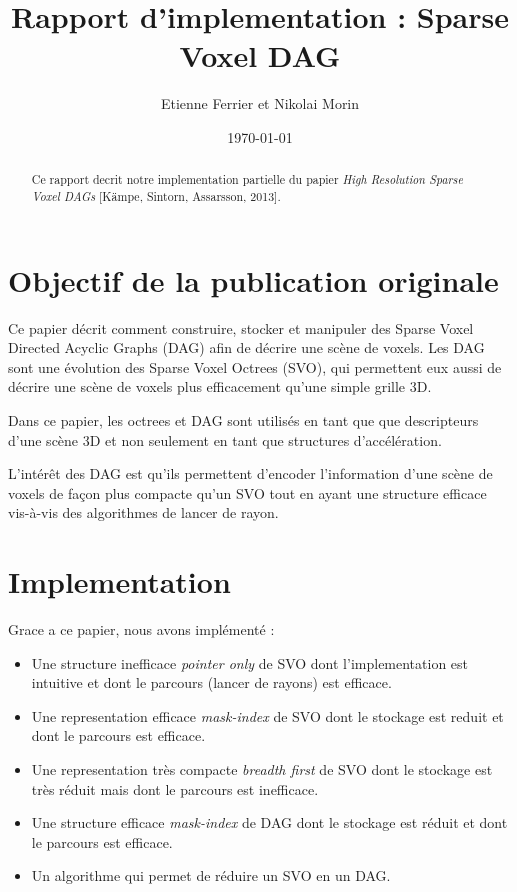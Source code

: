 \documentclass[a4paper]{article}
\title{Rapport d'implementation : Sparse Voxel DAG}
\author{Etienne Ferrier et Nikolai Morin}
\date{\today}
\begin{document}
\maketitle

\begin{abstract}
Ce rapport decrit notre implementation partielle du papier \textit{High Resolution Sparse Voxel DAGs} [Kämpe, Sintorn, Assarsson, 2013].
\end{abstract}

\section{Objectif de la publication originale}

Ce papier décrit comment construire, stocker et manipuler des Sparse Voxel Directed Acyclic Graphs (DAG) afin de décrire une scène de voxels. Les DAG sont une évolution des Sparse Voxel Octrees (SVO), qui permettent eux aussi de décrire une scène de voxels plus efficacement qu’une simple grille 3D.

Dans ce papier, les octrees et DAG sont utilisés en tant que que descripteurs d’une scène 3D et non seulement en tant que structures d’accélération.

L’intérêt des DAG est qu’ils permettent d’encoder l’information d'une scène de voxels de façon plus compacte qu’un SVO tout en ayant une structure efficace vis-à-vis des algorithmes de lancer de rayon.


\section{Implementation}

Grace a ce papier, nous avons implémenté :\\

\begin{itemize}
  \item Une structure inefficace \textit{pointer only} de SVO dont l'implementation est intuitive et dont le parcours (lancer de rayons) est efficace.
  \item Une representation efficace \textit{mask-index} de SVO dont le stockage est reduit et dont le parcours est efficace.
  \item Une representation très compacte \textit{breadth first} de SVO dont le stockage est très réduit mais dont le parcours est inefficace.
  \item Une structure efficace \textit{mask-index} de DAG  dont le stockage est réduit et dont le parcours est efficace.
  \item Un algorithme qui permet de réduire un SVO en un DAG.\\
\end{itemize}
\end{document}
